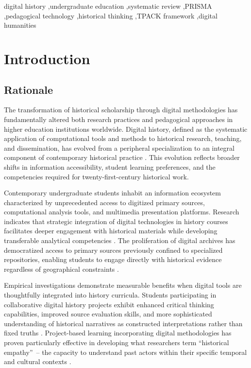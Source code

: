 \documentclass[
hf,
]{ceurart}
\begin{document}
\begin{keywords}
digital history \sep  undergraduate education  \sep  systematic review  \sep  PRISMA  \sep  pedagogical technology  \sep  historical thinking  \sep  TPACK framework  \sep  digital humanities
\end{keywords}

\maketitle
\thispagestyle{plain}



\section{Introduction}

\subsection{Rationale}

The transformation of historical scholarship through digital methodologies has fundamentally altered both research practices and pedagogical approaches in higher education institutions worldwide. Digital history, defined as the systematic application of computational tools and methods to historical research, teaching, and dissemination, has evolved from a peripheral specialization to an integral component of contemporary historical practice \cite{Wright-Maley2018, Block2021}. This evolution reflects broader shifts in information accessibility, student learning preferences, and the competencies required for twenty-first-century historical work.

Contemporary undergraduate students inhabit an information ecosystem characterized by unprecedented access to digitized primary sources, computational analysis tools, and multimedia presentation platforms. Research indicates that strategic integration of digital technologies in history courses facilitates deeper engagement with historical materials while developing transferable analytical competencies \cite{Coleborne2011, Tilak2023}. The proliferation of digital archives has democratized access to primary sources previously confined to specialized repositories, enabling students to engage directly with historical evidence regardless of geographical constraints \cite{Nygren2014, Corlett-Rivera2017}.

Empirical investigations demonstrate measurable benefits when digital tools are thoughtfully integrated into history curricula. Students participating in collaborative digital history projects exhibit enhanced critical thinking capabilities, improved source evaluation skills, and more sophisticated understanding of historical narratives as constructed interpretations rather than fixed truths \cite{Bell2016, Davis2017}. Project-based learning incorporating digital methodologies has proven particularly effective in developing what researchers term ``historical empathy''~-- the capacity to understand past actors within their specific temporal and cultural contexts \cite{Darmawan2025, Cheng2023}.
\end{document}
